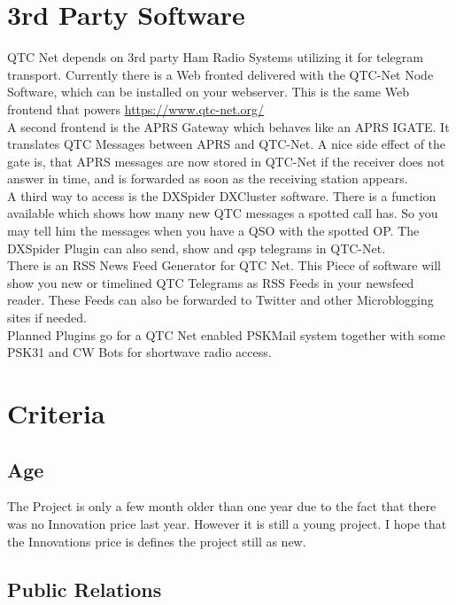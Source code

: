 \documentclass{article}
\begin{document}
\section{3rd Party Software}

QTC Net depends on 3rd party Ham Radio Systems utilizing it for telegram
transport. Currently there is a Web fronted delivered with the QTC-Net Node
Software, which can be installed on your webserver. This is the same Web
frontend that powers \url{https://www.qtc-net.org/} \\

A second frontend is the APRS Gateway which behaves like an APRS IGATE. It
translates QTC Messages between APRS and QTC-Net. A nice side effect of the
gate is, that APRS messages are now stored in QTC-Net if the receiver does 
not answer in time, and is forwarded as soon as the receiving station 
appears. \\

A third way to access is the DXSpider DXCluster software. There is a function 
available which shows how many new QTC messages a spotted call has. So you may
tell him the messages when you have a QSO with the spotted OP. The DXSpider
Plugin can also send, show and qsp telegrams in QTC-Net. \\

There is an RSS News Feed Generator for QTC Net. This Piece of software will 
show you new or timelined QTC Telegrams as RSS Feeds in your newsfeed reader.
These Feeds can also be forwarded to Twitter and other Microblogging sites if
needed. \\ 

Planned Plugins go for a QTC Net enabled PSKMail system together with some 
PSK31 and CW Bots for shortwave radio access. 


\section{Criteria}

\subsection{Age}

The Project is only a few month older than one year due to the fact
that there was no Innovation price last year. However it is still a young 
project. I hope that the Innovations price is defines the project still as 
new. 

\subsection{Public Relations}
\end{document}
